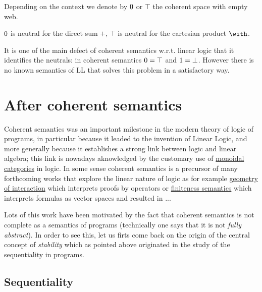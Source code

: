 Depending on the context we denote by \(0\) or \(\top\) the coherent
space with empty web.

\begin{theorem}
$0$ is neutral for the direct sum $\plus$, $\top$ is neutral for the cartesian product $\with$.
\end{theorem}

\begin{remark}
It is one of the main defect of coherent semantics w.r.t. linear logic that it identifies the neutrals: in coherent semantics $0 = \top$ and $1 = \bot$. However there is no known semantics of LL that solves this problem in a satisfactory way.
\end{remark}

\section{After coherent semantics}\label{after-coherent-semantics}

Coherent semantics was an important milestone in the modern theory of
logic of programs, in particular because it leaded to the invention of
Linear Logic, and more generally because it establishes a strong link
between logic and linear algebra; this link is nowadays aknowledged by
the customary use of \hyperref[categorical-semantics]{monoidal categories}
in logic. In some sense coherent semantics is a precursor of many
forthcoming works that explore the linear nature of logic as for example
\hyperref[geometry-of-interaction]{geometry of interaction} which interprets
proofs by operators or \hyperref[finiteness-semantics]{finiteness semantics}
which interprets formulas as vector spaces and resulted in
...

Lots of this work have been motivated by the fact that coherent
semantics is not complete as a semantics of programs (technically one
says that it is not \emph{fully abstract}). In order to see this, let us
firts come back on the origin of the central concept of \emph{stability}
which as pointed above originated in the study of the sequentiality in
programs.

\subsection{Sequentiality}\label{sequentiality}

